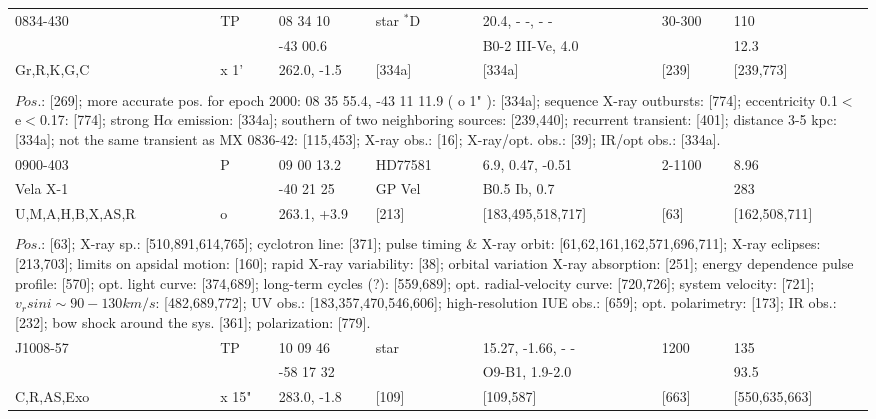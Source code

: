 \documentclass{aa}
\begin{document}
\begin{table*}[h]
\begin{tabular}{p{2.5cm}p{1cm}p{1.8cm}p{2.3cm}p{3.3cm}p{2.0cm}p{2.2cm}}
\noalign{\smallskip}
\hline
\noalign{\smallskip}
0834-430      &   TP   &  08 34 10       & star $^*$D  & 20.4, - -, - -                &     30-300      &     110 \\
                       &           & -43 00.6         &                       & B0-2 III-Ve, 4.0        &                       &    12.3   \\
Gr,R,K,G,C  & x 1'    & 262.0, -1.5     &  [334a]         & [334a]                       & [239]             & [239,773]  \\
\\
\multicolumn{7}{p{17.5cm}}{
$Pos$.: [269];  more accurate pos. for epoch 2000: 08 35 55.4, -43 11 11.9 ( o 1" ): [334a]; 
sequence X-ray outbursts: [774]; eccentricity 0.1$<$e$<$0.17: [774]; strong H$\alpha$ emission: [334a];
southern of two neighboring sources: [239,440]; recurrent transient: [401]; distance 3-5 kpc: [334a]; 
not the same transient as MX 0836-42: [115,453]; X-ray obs.: [16]; X-ray/opt. obs.: [39]; IR/opt obs.: [334a].   }\\

\noalign{\smallskip}
\hline
\noalign{\smallskip}
 0900-403                  &   P      & 09 00 13.2        & HD77581    & 6.9, 0.47, -0.51            &   2-1100      &  8.96                     \\
 Vela X-1                   &            & -40 21 25          &  GP Vel       & B0.5 Ib, 0.7                 &                      &  283                      \\
U,M,A,H,B,X,AS,R  &  o        & 263.1, +3.9       &     [213]        & [183,495,518,717]     &        [63]       &  [162,508,711]    \\
\\
\multicolumn{7}{p{17.5cm}}{
$Pos$.: [63]; X-ray sp.: [510,891,614,765]; cyclotron line: [371]; pulse timing \& X-ray orbit: 
[61,62,161,162,571,696,711]; X-ray eclipses: [213,703]; limits on apsidal motion: [160]; rapid X-ray variability: [38];
orbital variation X-ray absorption: [251]; energy dependence pulse profile: [570]; opt. light curve: [374,689];
long-term cycles (?): [559,689]; opt. radial-velocity curve: [720,726]; system velocity: [721]; 
$v_rsin i \sim 90-130 km/s$: [482,689,772]; UV obs.: [183,357,470,546,606]; high-resolution IUE obs.: [659]; 
opt. polarimetry: [173]; IR obs.: [232]; bow shock around the sys. [361]; polarization: [779].}\\

\noalign{\smallskip}
\hline
\noalign{\smallskip}
J1008-57         &  TP       &  10 09 46    &  star          &   15.27, -1.66, - -             &  1200      & 135                     \\
                          &              & -58 17 32    &                    &   O9-B1, 1.9-2.0             &                 &     93.5                 \\
C,R,AS,Exo    & x 15"    & 283.0, -1.8  &    [109]      &     [109,587]                     & [663]       &   [550,635,663] \\
  

\end{tabular}
\end{table*}
\end{document}

